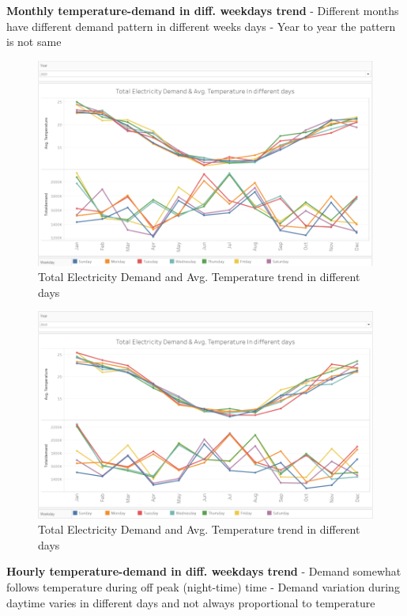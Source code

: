 \documentclass[mstat,12pt]{unswthesis}
\begin{document}
\textbf{Monthly temperature-demand in diff. weekdays trend} \newline
\newline - Different months have different demand pattern in different
weeks days \newline - Year to year the pattern is not same \newline

\begin{figure}[H]
\includegraphics{snapshots/Weekdays trend 1.png}
\caption{Total Electricity Demand and Avg. Temperature trend in different days}\label{4.2}
\end{figure}

\begin{figure}[H]
\includegraphics{snapshots/Weekdays trend 2.png}
\caption{Total Electricity Demand and Avg. Temperature trend in different days}\label{4.3}
\end{figure}

\textbf{Hourly temperature-demand in diff. weekdays trend} \newline
\newline - Demand somewhat follows temperature during off peak
(night-time) time \newline - Demand variation during daytime varies in
different days and not always proportional to temperature \newline
\end{document}
